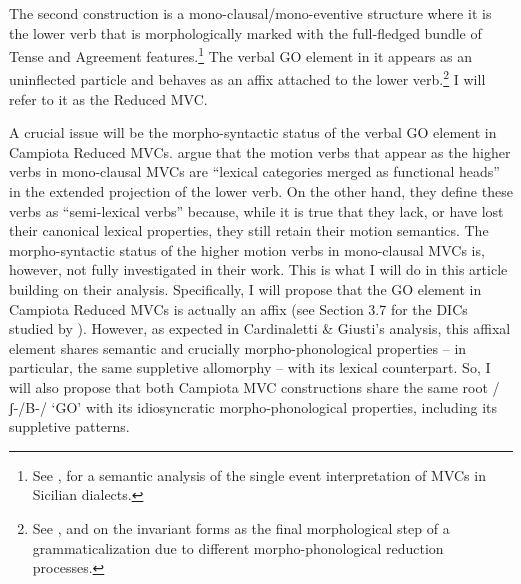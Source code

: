 \documentclass[output=paper]{langscibook}
\begin{document}
The second construction is a mono-clausal/mono-eventive structure where it is the lower verb that is morphologically marked with the full-fledged bundle of Tense and Agreement features.\footnote{See \cite{prete2020a}, \cite{todaro2018a} for a semantic analysis of the single event interpretation of MVCs in Sicilian dialects.}  The verbal GO element in it appears as an uninflected particle and behaves as an affix attached to the lower verb.\footnote{See \cite{cruschina2013a}, \cite{cruschina2021a} and \cite{ledgeway2016a} on the invariant forms as the final morphological step of a grammaticalization due to different morpho-phonological reduction processes.}  I will refer to it as the Reduced MVC.   

A crucial issue will be the morpho-syntactic status of the verbal GO element in Campiota Reduced MVCs. \cite{cardinaletti2003a} argue that the motion verbs that appear as the higher verbs in mono-clausal MVCs are “lexical categories merged as functional heads” in the extended projection of the lower verb. On the other hand, they define these verbs as “semi-lexical verbs” because, while it is true that they lack, or have lost their canonical lexical properties, they still retain their motion semantics. The morpho-syntactic status of the higher motion verbs in mono-clausal MVCs is, however, not fully investigated in their work.  This is what I will do in this article building on their analysis.  Specifically, I will propose that the GO element in Campiota Reduced MVCs is actually an affix (see Section 3.7 for the DICs studied by \cite{cardinaletti2003a}). However, as expected in Cardinaletti \& Giusti’s analysis, this affixal element shares semantic and crucially morpho-phonological properties -- in particular, the same suppletive allomorphy --  with its lexical counterpart.  So, I will also propose that both Campiota MVC constructions share the same root /ʃ-/B-/ ‘GO’ with its idiosyncratic morpho-phonological properties, including its suppletive patterns. 
\end{document}
